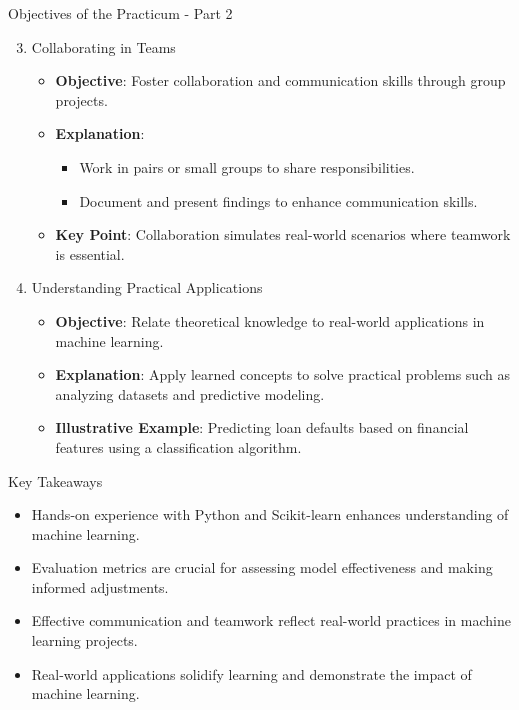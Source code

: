 \documentclass[aspectratio=169]{beamer}
\begin{document}
\begin{frame}[fragile]{Objectives of the Practicum - Part 2}
    \begin{enumerate}
        \setcounter{enumi}{2} %
        \item Collaborating in Teams
            \begin{itemize}
                \item \textbf{Objective}: Foster collaboration and communication skills through group projects.
                \item \textbf{Explanation}:
                    \begin{itemize}
                        \item Work in pairs or small groups to share responsibilities.
                        \item Document and present findings to enhance communication skills.
                    \end{itemize}
                \item \textbf{Key Point}: Collaboration simulates real-world scenarios where teamwork is essential.
            \end{itemize}

        \item Understanding Practical Applications
            \begin{itemize}
                \item \textbf{Objective}: Relate theoretical knowledge to real-world applications in machine learning.
                \item \textbf{Explanation}: Apply learned concepts to solve practical problems such as analyzing datasets and predictive modeling.
                \item \textbf{Illustrative Example}: Predicting loan defaults based on financial features using a classification algorithm.
            \end{itemize}
    \end{enumerate}
\end{frame}

\begin{frame}[fragile]{Key Takeaways}
    \begin{itemize}
        \item Hands-on experience with Python and Scikit-learn enhances understanding of machine learning.
        \item Evaluation metrics are crucial for assessing model effectiveness and making informed adjustments.
        \item Effective communication and teamwork reflect real-world practices in machine learning projects.
        \item Real-world applications solidify learning and demonstrate the impact of machine learning.
    \end{itemize}
\end{frame}
\end{document}
